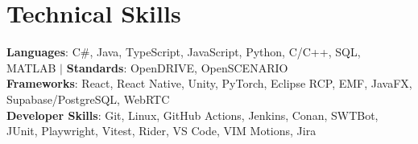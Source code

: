 \section{Technical Skills}
 \begin{itemize}[leftmargin=0.15in, label={}]
    \small{\item{
     \textbf{Languages}{: C\#, Java, TypeScript, JavaScript, Python, C/C++, SQL, MATLAB $|$ \textbf{Standards}: OpenDRIVE, OpenSCENARIO} \\
     \textbf{Frameworks}{: React, React Native, Unity, PyTorch, Eclipse RCP, EMF, JavaFX, Supabase/PostgreSQL, WebRTC} \\
     \textbf{Developer Skills}{: Git, Linux, GitHub Actions, Jenkins, Conan, SWTBot, JUnit, Playwright, Vitest, Rider, VS Code, VIM Motions, Jira} \\
    }}
 \end{itemize}
